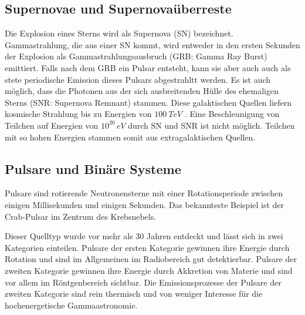 \subsection{Supernovae und Supernovaüberreste}
Die Explosion eines Sterns wird als Supernova (SN) bezeichnet.
Gammastrahlung, die aus einer SN kommt, wird entweder in den ersten Sekunden der Explosion als Gammastrahlungsausbruch (GRB: Gamma Ray Burst) emittiert.
Falls nach dem GRB ein Pulsar entsteht, kann sie aber auch auch als stete periodische Emission dieses Pulsars abgestrahltt werden.
Es ist auch möglich, dass die Photonen aus der sich ausbreitenden Hülle des ehemaligen Sterns (SNR: Supernova Remnant) stammen. 
Diese galaktischen Quellen liefern kosmische Strahlung bis zu Energien von $\SI{100}{TeV}$ \cite{Weekes}.
Eine Beschleunigung von Teilchen auf Energien von $10^{20}\,\si{eV}$ durch SN und SNR ist nicht möglich.
Teilchen mit so hohen Energien stammen somit aus extragalaktischen Quellen.\cite{Weekes}



\subsection{Pulsare und Binäre Systeme}
Pulsare sind rotierende Neutronensterne mit einer Rotationsperiode zwischen einigen Millisekunden und einigen Sekunden.
Das bekannteste Beispiel ist der Crab-Pulsar im Zentrum des Krebsnebels.

Dieser Quelltyp wurde vor mehr als 30 Jahren entdeckt und lässt sich in zwei Kategorien einteilen.
Pulsare der ersten Kategorie gewinnen ihre Energie durch Rotation und sind im Allgemeinen im Radiobereich gut detektierbar.
Pulsare der zweiten Kategorie gewinnen ihre Energie durch Akkretion von Materie und sind vor allem im Röntgenbereich sichtbar.
Die Emissionsprozesse der Pulsare der zweiten Kategorie sind rein thermisch und von weniger Interesse für die hochenergetische Gammaastronomie.

